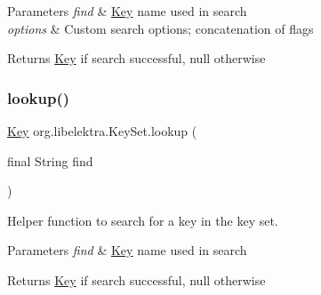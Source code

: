 \begin{DoxyParams}{Parameters}
{\em find} & \hyperlink{classorg_1_1libelektra_1_1Key}{Key} name used in search \\
\hline
{\em options} & Custom search options; concatenation of flags \\
\hline
\end{DoxyParams}
\begin{DoxyReturn}{Returns}
\hyperlink{classorg_1_1libelektra_1_1Key}{Key} if search successful, null otherwise 
\end{DoxyReturn}
\mbox{\label{classorg_1_1libelektra_1_1KeySet_a69921726091c9a775bb8ece1f1e3a858}} 
\subsubsection{\texorpdfstring{lookup()}{lookup()}\hspace{0.1cm}{\footnotesize\ttfamily [4/4]}}
{\footnotesize\ttfamily \hyperlink{classorg_1_1libelektra_1_1Key}{Key} org.\+libelektra.\+Key\+Set.\+lookup (\begin{DoxyParamCaption}\item[{final String}]{find }\end{DoxyParamCaption})\hspace{0.3cm}{\ttfamily [inline]}}



Helper function to search for a key in the key set. 


\begin{DoxyParams}{Parameters}
{\em find} & \hyperlink{classorg_1_1libelektra_1_1Key}{Key} name used in search \\
\hline
\end{DoxyParams}
\begin{DoxyReturn}{Returns}
\hyperlink{classorg_1_1libelektra_1_1Key}{Key} if search successful, null otherwise 
\end{DoxyReturn}
\mbox{\label{classorg_1_1libelektra_1_1KeySet_a9a21c729da19bc6fb2e7f33fe06ee15e}} 
